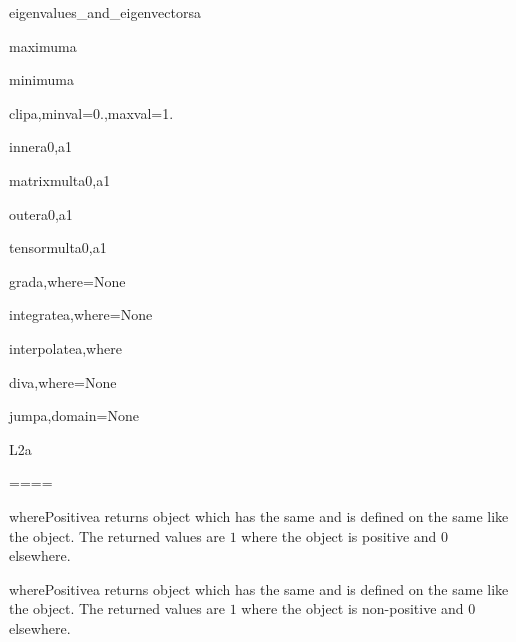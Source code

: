 \begin{funcdesc}{eigenvalues_and_eigenvectors}{a}
\end{funcdesc}
\begin{funcdesc}{maximum}{a}
\end{funcdesc}
\begin{funcdesc}{minimum}{a}
\end{funcdesc}
\begin{funcdesc}{clip}{a,minval=0.,maxval=1.}
\end{funcdesc}
\begin{funcdesc}{inner}{a0,a1}
\end{funcdesc}
\begin{funcdesc}{matrixmult}{a0,a1}
\end{funcdesc}
\begin{funcdesc}{outer}{a0,a1}
\end{funcdesc}
\begin{funcdesc}{tensormult}{a0,a1}
\end{funcdesc}
\begin{funcdesc}{grad}{a,where=None}
\end{funcdesc}
\begin{funcdesc}{integrate}{a,where=None}
\end{funcdesc}
\begin{funcdesc}{interpolate}{a,where}
\end{funcdesc}
\begin{funcdesc}{div}{a,where=None}
\end{funcdesc}
\begin{funcdesc}{jump}{a,domain=None}
\end{funcdesc}
\begin{funcdesc}{L2}{a}
\end{funcdesc}

====


\begin{funcdesc}{wherePositive}{a}
returns \Data object which has the same \Shape and is defined on
the same \FunctionSpace like the object. The returned values are $1$
where the object is positive and $0$ elsewhere.
\end{funcdesc}

\begin{funcdesc}{wherePositive}{a}
returns \Data object which has the same \Shape and is defined on
the same \FunctionSpace like the object. The returned values are $1$
where the object is non-positive and $0$ elsewhere.
\end{funcdesc}

